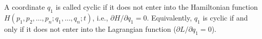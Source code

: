 A coordinate $q_1$ is called cyclic if it does not enter into the Hamiltonian function $H(p_1, p_2, \ldots, p_n; q_1, \ldots, q_n; t)$, i.e., $\partial H/\partial q_1 = 0$. Equivalently, $q_1$ is cyclic if and only if it does not enter into the Lagrangian function ($\partial L/\partial q_1 = 0$).